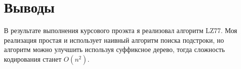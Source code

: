 \section{Выводы}

    В результате выполнения курсового проэкта я реализовал алгоритм LZ77.
    Моя реализация простая и использует наивный алгоритм поиска подстроки, но алгоритм можно улучшить 
    используя суффиксное дерево, тогда сложность кодирования станет $O(n^2)$.

\pagebreak
